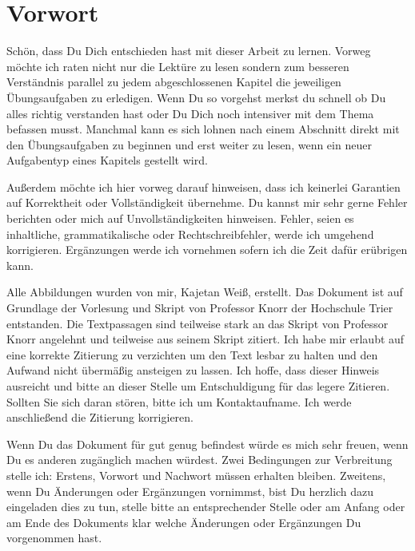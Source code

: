 \chapter*{Vorwort}
Schön, dass Du Dich entschieden hast mit dieser Arbeit zu lernen. Vorweg möchte ich raten nicht nur die Lektüre zu lesen sondern zum besseren Verständnis parallel zu jedem abgeschlossenen Kapitel die jeweiligen Übungsaufgaben zu erledigen. Wenn Du so vorgehst merkst du schnell ob Du alles richtig verstanden hast oder Du Dich noch intensiver mit dem Thema befassen musst. Manchmal kann es sich lohnen nach einem Abschnitt direkt mit den Übungsaufgaben zu beginnen und erst weiter zu lesen, wenn ein neuer Aufgabentyp eines Kapitels gestellt wird.

Außerdem möchte ich hier vorweg darauf hinweisen, dass ich keinerlei Garantien auf Korrektheit oder Vollständigkeit übernehme. Du kannst mir sehr gerne Fehler berichten oder mich auf Unvollständigkeiten hinweisen. Fehler, seien es inhaltliche, grammatikalische oder Rechtschreibfehler, werde ich umgehend korrigieren. Ergänzungen werde ich vornehmen sofern ich die Zeit dafür erübrigen kann.


Alle Abbildungen wurden von mir, Kajetan Weiß, erstellt. Das Dokument ist auf Grundlage der Vorlesung und Skript von Professor Knorr der Hochschule Trier entstanden. Die Textpassagen sind teilweise stark an das Skript von Professor Knorr angelehnt und teilweise aus seinem Skript zitiert. Ich habe mir erlaubt auf eine korrekte Zitierung zu verzichten um den Text lesbar zu halten und den Aufwand nicht übermäßig ansteigen zu lassen. Ich hoffe, dass dieser Hinweis ausreicht und bitte an dieser Stelle um Entschuldigung für das legere Zitieren. Sollten Sie sich daran stören, bitte ich um Kontaktaufname. Ich werde anschließend die Zitierung korrigieren.

Wenn Du das Dokument für gut genug befindest würde es mich sehr freuen, wenn Du es anderen zugänglich machen würdest. Zwei Bedingungen zur Verbreitung stelle ich: Erstens, Vorwort und Nachwort müssen erhalten bleiben. Zweitens, wenn Du Änderungen oder Ergänzungen vornimmst, bist Du herzlich dazu eingeladen dies zu tun, stelle bitte an entsprechender Stelle oder am Anfang oder am Ende des Dokuments klar welche Änderungen oder Ergänzungen Du vorgenommen hast.

